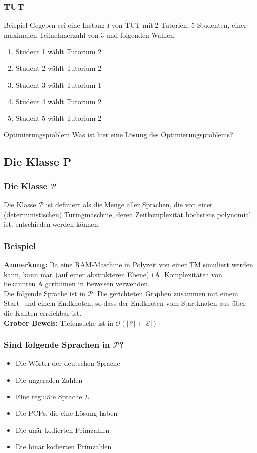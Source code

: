 \documentclass{beamer}
\begin{document}
{\begin{frame}
\frametitle{TUT}
\begin{block}{Beispiel}
 Gegeben sei eine Instanz \textit{I} von TUT mit 2 Tutorien, 5 Studenten, einer maximalen Teilnehmerzahl von 3 und folgenden Wahlen:
 \begin{enumerate}
  \item Student 1 wählt Tutorium 2
  \item Student 2 wählt Tutorium 2
  \item Student 3 wählt Tutorium 1
  \item Student 4 wählt Tutorium 2
  \item Student 5 wählt Tutorium 2
 \end{enumerate}
\end{block}
\begin{block}{Optimierungsproblem}
 Was ist hier eine Lösung des Optimierungsproblems? 
\end{block}
\end{frame}

\subsection{Die Klasse P}
\begin{frame}
\frametitle{Die Klasse $\mathcal{P}$}
Die Klasse $\mathcal{P}$ ist definiert als die Menge aller Sprachen, die von einer (deterministischen) Turingmaschine, deren Zeitkomplexität höchstens polynomial ist, entschieden werden können.\\[6pt]
\end{frame}

\begin{frame}
\frametitle{Beispiel}
\textbf{Anmerkung:} Da eine RAM-Maschine in Polyzeit von einer TM simuliert werden kann, kann man (auf einer abstrakteren Ebene) i.A. Komplexitäten von bekannten Algorithmen in Beweisen verwenden.\\[10pt]
Die folgende Sprache ist in $\mathcal{P}$: Die gerichteten Graphen zusammen mit einem Start- und einem Endknoten, so dass der Endknoten vom Startknoten aus über die Kanten erreichbar ist.\\[6pt]
\textbf{Grober Beweis:}	Tiefensuche ist in $\mathcal{O}(|\mathcal{V}| + |\mathcal{E}|)$
\end{frame}

\begin{frame}
\frametitle{Sind folgende Sprachen in $\mathcal{P}$?}
\begin{itemize}
\item Die Wörter der deutschen Sprache
\item Die ungeraden Zahlen
\item Eine reguläre Sprache $L$
\item Die PCPs, die eine Lösung haben
\item Die unär kodierten Primzahlen
\item Die binär kodierten Primzahlen
\end{itemize}
\end{frame}

}
\end{document}
